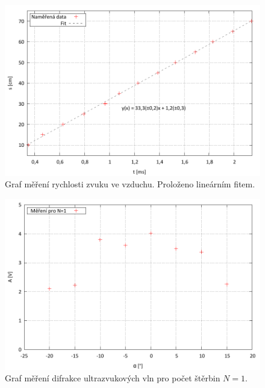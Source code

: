 \documentclass[english]{article}
\begin{document}
	\begin{figure}[p]
	\begin{center}
		\vspace*{-1cm}
		\includegraphics[width=\linewidth]{../gnuplot/8_sonar_vz_out.pdf}
		\vspace*{-1cm}    
		\caption{Graf měření rychlosti zvuku ve vzduchu. Proloženo lineárním fitem.}
		\label{fig:g_rychlost_zvuku}
	\end{center}
	\end{figure}
	
	\begin{figure}[p]
	\begin{center}
	    \vspace*{-1cm}
	    \includegraphics[width=\linewidth]{../gnuplot/8_sonar_if_1_out.pdf}
	    \vspace*{-1cm}    
		\caption{Graf měření difrakce ultrazvukových vln pro počet štěrbin $N=1$.}
		\label{fig:g_difrakce_n1}
	\end{center}
	\end{figure}
\end{document}
